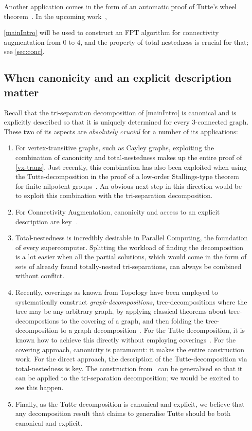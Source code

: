 \documentclass{aic}
\newcommand{\jaf}[3]{#2} %
\theoremstyle{plain}
\theoremstyle{definition}
\theoremstyle{plain}
\theoremstyle{plain}
\begin{document}
Another application comes in the form of an automatic proof of Tutte's wheel theorem~\cite{TutteWheel}. 
In 
\jaf{
the upcoming work~\cite{conny_aug},
}{%
the upcoming work~\cite{conny_aug},
}{%
upcoming work,
}
\autoref{mainIntro} will be used to construct an FPT algorithm for connectivity augmentation from 0 to 4, and the property of total nestedness is crucial for that; see \autoref{sec:conc}.

\subsection*{When canonicity and an explicit description matter}

Recall that the tri-separation decomposition of \autoref{mainIntro} is canonical and is explicitly described so that it is uniquely determined for every 3-connected graph.
These two of its aspects are \emph{absolutely crucial} for a number of its applications:
\begin{enumerate}
    \item For vertex-transitive graphs, such as Cayley graphs, exploiting the combination of canonicity and total-nestedness makes up the entire proof of \autoref{vx-trans}.
    Just recently, this combination has also been exploited when using the Tutte-decomposition in the proof of a low-order Stallings-type theorem for finite nilpotent groups~\cite{Cayley2sep}.
    An obvious next step in this direction would be to exploit this combination with the tri-separation decomposition.
    \item For Connectivity Augmentation, canonicity and access to an explicit description are key~\cite{conny_aug}.
    \item Total-nestedness is incredibly desirable in Parallel Computing, the foundation of every supercomputer. Splitting the workload of finding the decomposition is a lot easier when all the partial solutions, which would come in the form of sets of already found totally-nested tri-separations, can always be combined without conflict.
    \item Recently, coverings as known from Topology have been employed to systematically construct \emph{graph-decompositions}, tree-decompositions where the tree may be any arbitrary graph, by applying classical theorems about tree-decompostions to the covering of a graph, and then folding the tree-decomposition to a graph-decomposition~\cite{GraphDec}.
    For the Tutte-decomposition, it is known how to achieve this directly without employing coverings~\cite{loc2sepr}.
    For the covering approach, canonicity is paramount: it makes the entire construction work.
    For the direct approach, the description of the Tutte-decomposition via total-nestedness is key.
    The construction from~\cite{GraphDec} can be generalised so that it can be applied to the tri-separation decomposition; we would be excited to see this happen.
    \item Finally, as the Tutte-decomposition is canonical and explicit, we believe that any decomposition result that claims to generalise Tutte should be both canonical and explicit.
\end{enumerate}
\end{document}
